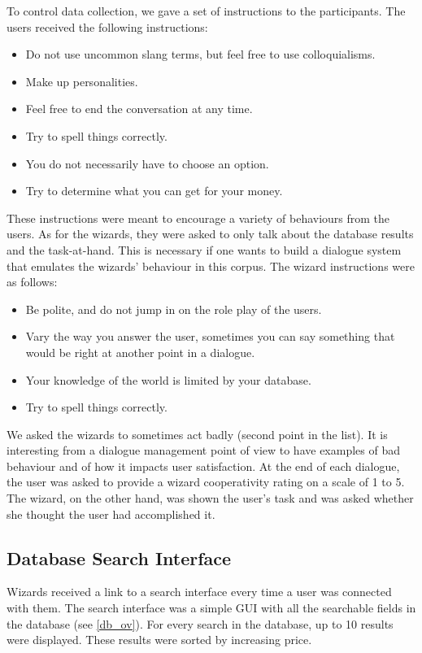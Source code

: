 \documentclass{article}
\theoremstyle{definition}
\begin{document}
To control data collection, we gave a set of instructions to the participants. The users received the following instructions:
\begin{itemize}[noitemsep]
\item Do not use uncommon slang terms, but feel free to use colloquialisms.
\item Make up personalities.
\item Feel free to end the conversation at any time.
\item Try to spell things correctly.
\item You do not necessarily have to choose an option.
\item Try to determine what you can get for your money.
\end{itemize}
These instructions were meant to encourage a variety of behaviours from the users. As for the wizards, they were asked to only talk about the database results and the task-at-hand. This is necessary if one wants to build a dialogue system that emulates the wizards' behaviour in this corpus. The wizard instructions were as follows:
\begin{itemize}[noitemsep]
\item Be polite, and do not jump in on the role play of the users.
\item Vary the way you answer the user, sometimes you can say something that would be right at another point in a dialogue.
\item Your knowledge of the world is limited by your database.
\item Try to spell things correctly.
\end{itemize}
We asked the wizards to sometimes act badly (second point in the list). It is interesting from a dialogue management point of view to have examples of bad behaviour and of how it impacts user satisfaction. At the end of each dialogue, the user was asked to provide a wizard cooperativity rating on a scale of 1 to 5. The wizard, on the other hand, was shown the user's task and was asked whether she thought the user had accomplished it.

\subsection{Database Search Interface} 
Wizards received a link to a search interface every time a user was connected with them. The search interface was a simple GUI with all the searchable fields in the database (see \cref{db_ov}). For every search in the database, up to 10 results were displayed. These results were sorted by increasing price.
\end{document}
